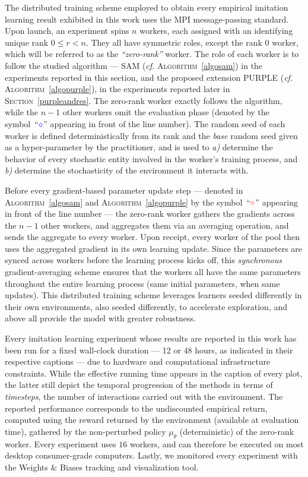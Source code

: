 The distributed training scheme employed to obtain every empirical imitation learning result
exhibited in this work uses the MPI message-passing standard.
Upon launch, an experiment spins $n$ workers,
each assigned with an identifying unique rank $0 \leq r < n$.
They all have symmetric roles, except the rank $0$ worker,
which will be referred to as the \textit{``zero-rank''} worker.
The role of each worker is to follow the studied algorithm ---
SAM (\textit{cf.} \textsc{Algorithm}~\ref{algosam})
in the experiments reported in this section, and the proposed extension
PURPLE (\textit{cf.} \textsc{Algorithm}~\ref{algopurple}),
in the experiments reported later
in \textsc{Section}~\ref{purpleandres}.
The zero-rank worker exactly follows the algorithm, while
the $n-1$ other workers omit
the evaluation phase (denoted by the symbol~``$\textcolor{blue}{\diamond}$'' appearing
in front of the line number).
The random seed of each worker is defined deterministically from its rank
and the \textit{base} random seed given as a hyper-parameter by the practitioner,
and is used to \textit{a)} determine the behavior of every stochastic entity involved in
the worker's training process,
and \textit{b)} determine the stochasticity of the environment it interacts with.

Before every gradient-based parameter update step
--- denoted in \textsc{Algorithm}~\ref{algosam} and \textsc{Algorithm}~\ref{algopurple}
by the symbol~``$\textcolor{red}{\diamond}$'' appearing
in front of the line number ---
the zero-rank worker gathers the gradients across the $n-1$ other workers,
and aggregates them via an averaging operation,
and sends the aggregate to every worker.
Upon receipt, every worker of the pool then uses the aggregated gradient
in its own learning update.
Since the parameters are synced across workers before the learning process kicks off,
this \emph{synchronous} gradient-averaging scheme
ensures that the workers all have the same parameters
throughout the entire learning process (same initial parameters, when same updates).
This distributed training scheme leverages learners seeded differently in their own
environments, also seeded differently, to accelerate exploration, and above all
provide the model with greater robustness.

Every imitation learning experiment whose results are reported in this work
has been run for a fixed wall-clock duration
--- 12 or 48 hours, as indicated in their respective captions ---
due to hardware and computational infrastructure constraints.
While the effective running time appears in the caption of every plot,
the latter still depict the temporal progression of the methods in terms of \emph{timesteps},
the number of interactions carried out with the environment.
The reported performance corresponds to the undiscounted empirical return,
computed using the reward returned by the environment (available at evaluation time),
gathered by the non-perturbed policy $\mu_\theta$ (deterministic) of the zero-rank worker.
Every experiment uses $16$ workers,
and can therefore be executed on most desktop consumer-grade computers.
Lastly, we monitored every experiment with the Weights \& Biases \cite{Biewald2020-wb} tracking and visualization tool.

